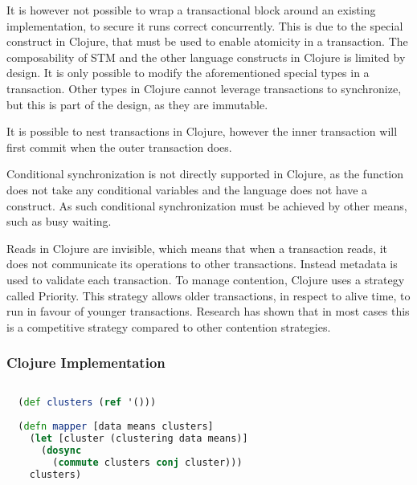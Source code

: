{It is however not possible to wrap a transactional block around an existing implementation, to secure it runs correct concurrently. This is due to the special  construct in Clojure, that must be used to enable atomicity in a transaction. The composability of \ac{STM} and the other language constructs in Clojure is limited by design. It is only possible to modify the aforementioned special types in a transaction. Other types in Clojure cannot leverage transactions to synchronize, but this is part of the design, as they are immutable. 

It is possible to nest transactions in Clojure, however the inner transaction will first commit when the outer transaction does.

Conditional synchronization is not directly supported in Clojure, as the  function does not take any conditional variables and the language does not have a  construct. As such conditional synchronization must be achieved by other means, such as busy waiting.

Reads in Clojure are invisible\cite{nielsen2010benchmarking}, which means that when a transaction reads, it does not communicate its operations to other transactions. Instead metadata is used to validate each transaction. To manage contention, Clojure uses a strategy called Priority\cite{nielsen2010benchmarking}. This strategy allows older transactions, in respect to alive time, to run in favour of younger transactions. Research\cite{nielsen2010benchmarking} has shown that in most cases this is a competitive strategy compared to other contention strategies. 

\subsubsection{Clojure Implementation}
\begin{lstlisting}[float,label=lst:stm_implementation,
  caption={\ac{STM} Implementation},
  language=clojure,  
  showspaces=false,
  showtabs=false,
  breaklines=true,
  showstringspaces=false,
  breakatwhitespace=true,
  commentstyle=\color{greencomments},
  keywordstyle=\color{bluekeywords},
  stringstyle=\color{redstrings}]  % Start your code-block
  
  (def clusters (ref '()))
    
  (defn mapper [data means clusters]
    (let [cluster (clustering data means)]
      (dosync
        (commute clusters conj cluster)))
    clusters)
\end{lstlisting}

}
